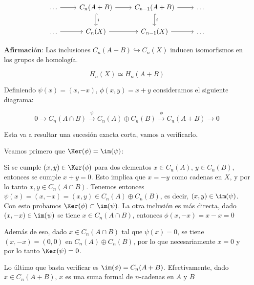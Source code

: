 \[\begin{tikzcd}
	\dots & {C_n(A+B)} & {C_{n-1}(A+B)} & \dots \\
	\dots & {C_n(X)} & {C_{n-1}(X)} & \dots
	\arrow[from=1-1, to=1-2]
	\arrow[from=1-2, to=1-3]
	\arrow["i", hook, from=1-2, to=2-2]
	\arrow[from=1-3, to=1-4]
	\arrow["i", hook, from=1-3, to=2-3]
	\arrow[from=2-1, to=2-2]
	\arrow[from=2-2, to=2-3]
	\arrow[from=2-3, to=2-4]
\end{tikzcd}\]

$\textbf{Afirmación:}$ Las inclusiones $C_n(A+B)\hookrightarrow C_n(X)$ inducen isomorfismos en los grupos de homología. 

$$H_n(X)\simeq H_n(A+B)$$


Definiendo $\psi(x)=(x,-x)$, $\phi(x,y)=x+y$ consideramos el siguiente diagrama:

$$0\rightarrow C_n(A\cap B)\xrightarrow{\psi}C_n(A)\oplus C_n(B)\xrightarrow{\phi}C_n(A+B)\rightarrow 0$$

Esta va a resultar una sucesión exacta corta, vamos a verificarlo.

Veamos primero que $\Ker(\phi)=\im(\psi)$: 

Si se cumple $(x,y)\in\Ker(\phi)$ para dos elementos $x\in C_n(A)$, $y\in C_n(B)$, entonces se cumple $x+y=0$. Esto implica que $x=-y$ como cadenas en $X$, y por lo tanto $x, y\in C_n(A\cap B)$. Tenemos entonces $\psi(x)=(x,-x)=(x,y)\in C_n(A)\oplus C_n(B)$, es decir, $(x,y)\in\im(\psi)$. Con esto probamos $\Ker(\phi)\subset \im(\psi)$. La otra inclusión es más directa, dado $(x,-x)\in\im(\psi)$ se tiene $x\in C_n(A\cap B)$, entonces $\phi(x,-x)=x-x=0$


Además de eso, dado $x\in C_n(A\cap B)$ tal que $\psi(x)=0$, se tiene $(x,-x)=(0,0)$ en $C_n(A)\oplus C_n(B)$, por lo que necesariamente $x=0$ y por lo tanto $\Ker(\psi)=0$.

Lo último que basta verificar es $\im(\phi)=C_n(A+B)$. Efectivamente, dado $x\in C_n(A+B)$, $x$ es una suma formal de $n$-cadenas en $A$ y $B$


    




